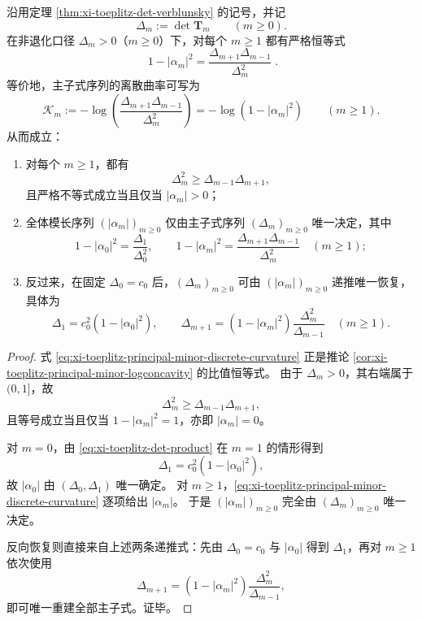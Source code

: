 \begin{theorem}\label{thm:xi-toeplitz-principal-minor-discrete-curvature-recovery}
沿用定理 \ref{thm:xi-toeplitz-det-verblunsky} 的记号，并记
\[
\Delta_m:=\det\mathbf{T}_m\qquad(m\ge 0).
\]
在非退化口径 \(\Delta_m>0\)（\(m\ge 0\)）下，对每个 \(m\ge 1\) 都有严格恒等式
\begin{equation}\label{eq:xi-toeplitz-principal-minor-discrete-curvature}
\boxed{\;
1-|\alpha_m|^2
=
\frac{\Delta_{m+1}\Delta_{m-1}}{\Delta_m^2}\; }.
\end{equation}
等价地，主子式序列的离散曲率可写为
\[
\mathcal K_m:=-\log\!\left(\frac{\Delta_{m+1}\Delta_{m-1}}{\Delta_m^2}\right)
=-\log(1-|\alpha_m|^2)
\qquad(m\ge 1).
\]
从而成立：
\begin{enumerate}
  \item 对每个 \(m\ge 1\)，都有
  \[
  \Delta_m^2\ge \Delta_{m-1}\Delta_{m+1},
  \]
  且严格不等式成立当且仅当 \(|\alpha_m|>0\)；
  \item 全体模长序列 \((|\alpha_m|)_{m\ge 0}\) 仅由主子式序列 \((\Delta_m)_{m\ge 0}\) 唯一决定，其中
  \[
  1-|\alpha_0|^2=\frac{\Delta_1}{\Delta_0^2},
  \qquad
  1-|\alpha_m|^2=\frac{\Delta_{m+1}\Delta_{m-1}}{\Delta_m^2}\quad(m\ge 1);
  \]
  \item 反过来，在固定 \(\Delta_0=c_0\) 后，\((\Delta_m)_{m\ge 0}\) 可由 \((|\alpha_m|)_{m\ge 0}\) 递推唯一恢复，具体为
  \[
  \Delta_1=c_0^2(1-|\alpha_0|^2),
  \qquad
  \Delta_{m+1}=(1-|\alpha_m|^2)\frac{\Delta_m^2}{\Delta_{m-1}}
  \quad(m\ge 1).
  \]
\end{enumerate}
\end{theorem}

\begin{proof}
式 \eqref{eq:xi-toeplitz-principal-minor-discrete-curvature} 正是推论
\ref{cor:xi-toeplitz-principal-minor-logconcavity} 的比值恒等式。
由于 \(\Delta_m>0\)，其右端属于 \((0,1]\)，故
\[
\Delta_m^2\ge \Delta_{m-1}\Delta_{m+1},
\]
且等号成立当且仅当 \(1-|\alpha_m|^2=1\)，亦即 \(|\alpha_m|=0\)。

对 \(m=0\)，由 \eqref{eq:xi-toeplitz-det-product} 在 \(m=1\) 的情形得到
\[
\Delta_1=c_0^2(1-|\alpha_0|^2),
\]
故 \(|\alpha_0|\) 由 \((\Delta_0,\Delta_1)\) 唯一确定。
对 \(m\ge 1\)，\eqref{eq:xi-toeplitz-principal-minor-discrete-curvature} 逐项给出 \(|\alpha_m|\)。
于是 \((|\alpha_m|)_{m\ge 0}\) 完全由 \((\Delta_m)_{m\ge 0}\) 唯一决定。

反向恢复则直接来自上述两条递推式：先由 \(\Delta_0=c_0\) 与 \(|\alpha_0|\) 得到 \(\Delta_1\)，再对 \(m\ge 1\) 依次使用
\[
\Delta_{m+1}=(1-|\alpha_m|^2)\frac{\Delta_m^2}{\Delta_{m-1}},
\]
即可唯一重建全部主子式。证毕。
\end{proof}

